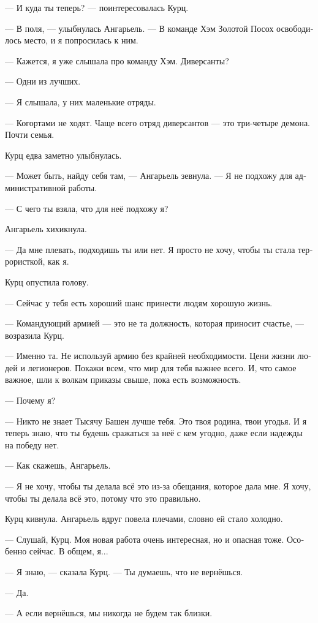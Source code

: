 \documentclass[a4paper,12pt,fleqn]{book}\usepackage{polyglossia}\setdefaultlanguage[babelshorthands=true]{russian}\setotherlanguage{english}\defaultfontfeatures{Ligatures=TeX,Mapping=tex-text}\usepackage{xcolor}\newcommand{\ml}[3]{#2}
\begin{document}
--- И куда ты теперь? --- поинтересовалась Курц.

--- В поля, --- улыбнулась Ангарьель.
--- В команде Хэм Золотой Посох освободилось место, и я попросилась к ним.

--- Кажется, я уже слышала про команду Хэм.
Диверсанты?

--- Одни из лучших.

--- Я слышала, у них маленькие отряды.

--- Когортами не ходят.
Чаще всего отряд диверсантов --- это три-четыре демона.
Почти семья.

Курц едва заметно улыбнулась.

--- Может быть, найду себя там, --- Ангарьель зевнула.
--- Я не подхожу для административной работы.

--- С чего ты взяла, что для неё подхожу я?

Ангарьель хихикнула.

--- Да мне плевать, подходишь ты или нет.
Я просто не хочу, чтобы ты стала террористкой, как я.

Курц опустила голову.

--- Сейчас у тебя есть хороший шанс принести людям хорошую жизнь.

--- Командующий армией --- это не та должность, которая приносит счастье, --- возразила Курц.

--- Именно та.
Не используй армию без крайней необходимости.
Цени жизни людей и легионеров.
Покажи всем, что мир для тебя важнее всего.
И, что самое важное, шли к волкам приказы свыше, пока есть возможность.

--- Почему я?

--- Никто не знает Тысячу Башен лучше тебя.
Это твоя родина, твои угодья.
И я теперь знаю, что ты будешь сражаться за неё с кем угодно, даже если надежды на победу нет.

--- Как скажешь, Ангарьель.

--- Я не хочу, чтобы ты делала всё это из-за обещания, которое дала мне.
Я хочу, чтобы ты делала всё это, потому что это правильно.

Курц кивнула.
Ангарьель вдруг повела плечами, словно ей стало холодно.

--- Слушай, Курц.
Моя новая работа очень интересная, но и опасная тоже.
Особенно сейчас.
В общем, я...

--- Я знаю, --- сказала Курц.
--- Ты думаешь, что не вернёшься.

--- Да.

\ml{$0$}
{--- А если вернёшься, мы никогда не будем так близки.}
{``And even if you come back, we'll never be as close as we are now.''}
\end{document}
